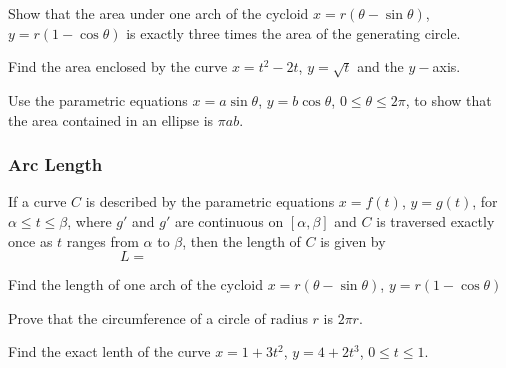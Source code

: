 \documentclass[notes2924]{subfiles}
\begin{document}
		\begin{ex}
			Show that the area under one arch of the cycloid $x = r(\theta - \sin\theta)$, $y = r(1-\cos \theta)$ is exactly three times the area of the generating circle.
		\end{ex}
			\newpage
			
		\begin{ex}
			Find the area enclosed by the curve $x = t^2-2t$, $y = \sqrt{t}$ and the $y-$axis.
		\end{ex}
			
		\begin{ex}
			Use the parametric equations $x = a\sin\theta$, $y = b\cos\theta$, $0\leq \theta \leq 2\pi$, to show that the area contained in an ellipse is $\pi ab$.
		\end{ex}
			
	\subsubsection*{Arc Length}
		\begin{rmk}
			If a curve $C$ is described by the parametric equations $x = f(t)$, $y = g(t)$, for $\alpha \leq t\leq \beta$, where $g'$ and $g'$ are continuous on $[\alpha,\beta]$ and $C$ is traversed exactly once as $t$ ranges from $\alpha$ to $\beta$, then the length of $C$ is given by\\
			\[L = \hspace{3in}\]	
		\end{rmk}
			\newpage
			
		\begin{pf}
		
		\end{pf}
			\vspace{2in}
		
		\begin{ex}
			Find the length of one arch of the cycloid $x = r(\theta - \sin\theta)$, $y = r(1-\cos\theta)$
		\end{ex}
			
		\begin{ex}
			Prove that the circumference of a circle of radius $r$ is $2\pi r$.
		\end{ex}
			\newpage
			
		\begin{ex}
			Find the exact lenth of the curve $x =1+3t^2$, $y = 4+2t^3$, $0\leq t\leq 1$.
		\end{ex}
			
\end{document}
